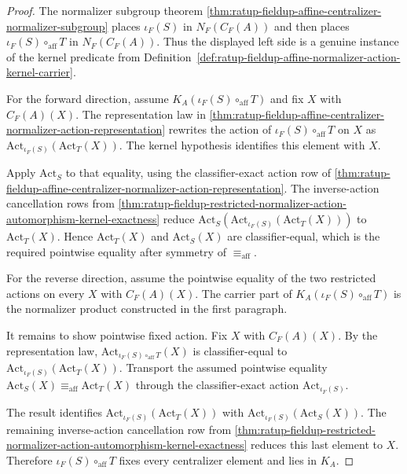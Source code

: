 \begin{proof}
The normalizer subgroup theorem
\autoref{thm:ratup-fieldup-affine-centralizer-normalizer-subgroup} places
$\iota_F(S)$ in $N_F(C_F(A))$ and then places
$\iota_F(S)\circ_{\mathrm{aff}}T$ in $N_F(C_F(A))$. Thus the displayed left
side is a genuine instance of the kernel predicate from
Definition~\ref{def:ratup-fieldup-affine-normalizer-action-kernel-carrier}.

For the forward direction, assume
$K_A(\iota_F(S)\circ_{\mathrm{aff}}T)$ and fix $X$ with $C_F(A)(X)$. The
representation law in
\autoref{thm:ratup-fieldup-affine-centralizer-normalizer-action-representation}
rewrites the action of $\iota_F(S)\circ_{\mathrm{aff}}T$ on $X$ as
$\mathrm{Act}_{\iota_F(S)}(\mathrm{Act}_T(X))$. The kernel hypothesis identifies
this element with $X$.

Apply $\mathrm{Act}_S$ to that equality, using the classifier-exact action row
of
\autoref{thm:ratup-fieldup-affine-centralizer-normalizer-action-representation}.
The inverse-action cancellation rows from
\autoref{thm:ratup-fieldup-restricted-normalizer-action-automorphism-kernel-exactness}
reduce
$\mathrm{Act}_S(\mathrm{Act}_{\iota_F(S)}(\mathrm{Act}_T(X)))$ to
$\mathrm{Act}_T(X)$. Hence $\mathrm{Act}_T(X)$ and $\mathrm{Act}_S(X)$ are
classifier-equal, which is the required pointwise equality after symmetry of
$\equiv_{\mathrm{aff}}$.

For the reverse direction, assume the pointwise equality of the two restricted
actions on every $X$ with $C_F(A)(X)$. The carrier part of
$K_A(\iota_F(S)\circ_{\mathrm{aff}}T)$ is the normalizer product constructed in
the first paragraph.

It remains to show pointwise fixed action. Fix $X$ with $C_F(A)(X)$. By the
representation law, $\mathrm{Act}_{\iota_F(S)\circ_{\mathrm{aff}}T}(X)$ is
classifier-equal to $\mathrm{Act}_{\iota_F(S)}(\mathrm{Act}_T(X))$. Transport the
assumed pointwise equality
$\mathrm{Act}_S(X)\equiv_{\mathrm{aff}}\mathrm{Act}_T(X)$ through the
classifier-exact action $\mathrm{Act}_{\iota_F(S)}$.

The result identifies
$\mathrm{Act}_{\iota_F(S)}(\mathrm{Act}_T(X))$ with
$\mathrm{Act}_{\iota_F(S)}(\mathrm{Act}_S(X))$. The remaining inverse-action
cancellation row from
\autoref{thm:ratup-fieldup-restricted-normalizer-action-automorphism-kernel-exactness}
reduces this last element to $X$. Therefore
$\iota_F(S)\circ_{\mathrm{aff}}T$ fixes every centralizer element and lies in
$K_A$.
\end{proof}

